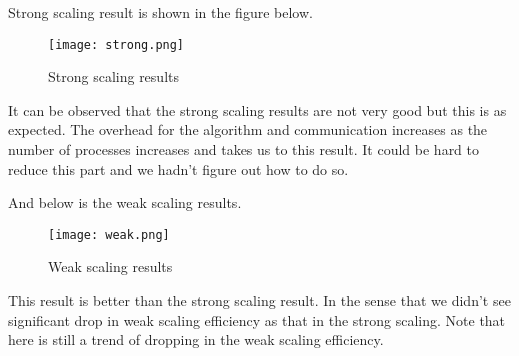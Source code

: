 Strong scaling result is shown in the figure below.

\begin{figure}[H]
\centering
\texttt{[image: strong.png]}
\caption{Strong scaling results}
\end{figure}

It can be observed that the strong scaling results are not very good but this is as expected. The overhead for the algorithm and communication increases as the number of processes increases and takes us to this result. It could be hard to reduce this part and we hadn't figure out how to do so.

And below is the weak scaling results.

\begin{figure}[H]
\centering
\texttt{[image: weak.png]}
\caption{Weak scaling results}
\end{figure}

This result is better than the strong scaling result. In the sense that we didn't see significant drop in weak scaling efficiency as that in the strong scaling. Note that here is still a trend of dropping in the weak scaling efficiency.